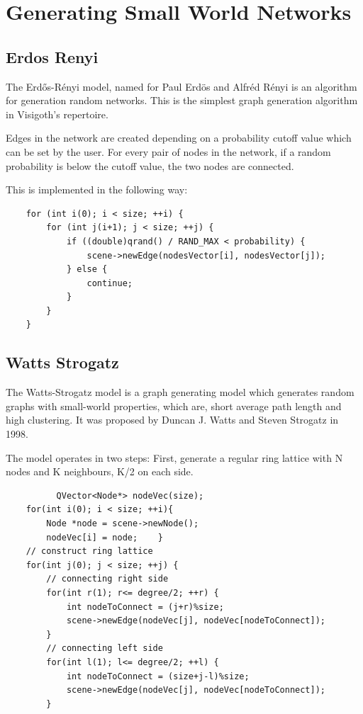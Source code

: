 \documentclass[a4paper,11pt,titlepage]{article}
\let\stdsection\section         %
\renewcommand{\section}{\newpage\stdsection}
\begin{document}
\section{Generating Small World Networks}

\subsection{Erdos Renyi}

The Erd\H{o}s-R\'{e}nyi model, named for Paul Erd\"{o}s and Alfr\'{e}d R\'{e}nyi is an algorithm for
generation random networks. This is the simplest graph generation algorithm in
Visigoth's repertoire.

Edges in the network are created depending on a probability cutoff value which
can be set by the user. For every pair of nodes in the network, if a random
probability is below the cutoff value, the two nodes are connected.

This is implemented in the following way:
\begin{lstlisting}
    for (int i(0); i < size; ++i) {
        for (int j(i+1); j < size; ++j) {
            if ((double)qrand() / RAND_MAX < probability) {
                scene->newEdge(nodesVector[i], nodesVector[j]);
            } else {
                continue;
            }
        }
    }
\end{lstlisting}
\subsection{Watts Strogatz}

The Watts-Strogatz model is a graph generating model which generates random
graphs with small-world properties, which are, short average path length and
high clustering. It was proposed by Duncan J. Watts and Steven Strogatz in 1998.

The model operates in two steps:
First, generate a regular ring lattice with N nodes and K neighbours, K/2 on
each side.
\begin{lstlisting}
          QVector<Node*> nodeVec(size);
    for(int i(0); i < size; ++i){
        Node *node = scene->newNode();
        nodeVec[i] = node;    }
    // construct ring lattice
    for(int j(0); j < size; ++j) {
        // connecting right side
        for(int r(1); r<= degree/2; ++r) {
            int nodeToConnect = (j+r)%size;
            scene->newEdge(nodeVec[j], nodeVec[nodeToConnect]);
        }
        // connecting left side
        for(int l(1); l<= degree/2; ++l) {
            int nodeToConnect = (size+j-l)%size;
            scene->newEdge(nodeVec[j], nodeVec[nodeToConnect]);
        }
\end{lstlisting}
\end{document}
